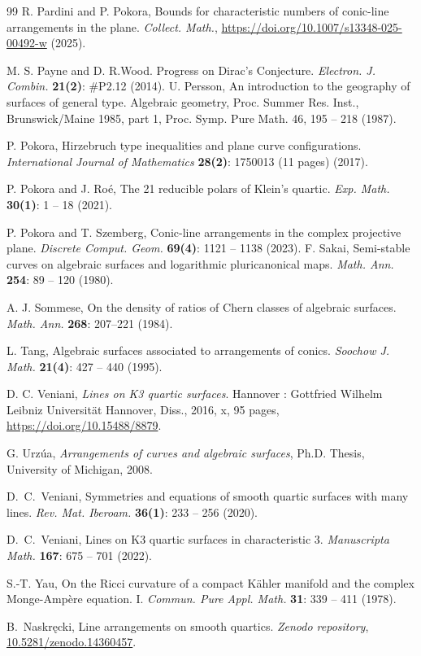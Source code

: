 \documentclass{article}
\theoremstyle{plain}
\theoremstyle{definition}
\numberwithin{equation}{section}
\begin{document}
\begin{thebibliography}{99}
R. Pardini and P. Pokora, Bounds for characteristic numbers of conic-line arrangements in the plane. \textit{Collect. Math.}, \url{ https://doi.org/10.1007/s13348-025-00492-w} (2025).

M. S. Payne and D. R.Wood. Progress on Dirac's Conjecture. \textit{Electron. J. Combin.} \textbf{21(2)}: \#P2.12 (2014).
U. Persson, An introduction to the geography of surfaces of general type. Algebraic geometry, Proc. Summer Res. Inst., Brunswick/Maine 1985, part 1, Proc. Symp. Pure Math. 46, 195 -- 218 (1987).

P. Pokora, \newblock Hirzebruch type inequalities and plane curve configurations. \newblock \textit{International Journal of Mathematics} \textbf{28(2)}: 1750013 (11 pages) (2017).

P. Pokora and J. Ro\'e, The 21 reducible polars of Klein's quartic. \textit{Exp. Math.} \textbf{30(1)}: 1 -- 18 (2021).

P. Pokora and T. Szemberg, Conic-line arrangements in the complex projective plane. \textit{Discrete Comput. Geom.} \textbf{69(4)}: 1121 -- 1138 (2023).
F. Sakai, \newblock Semi-stable curves on algebraic surfaces and logarithmic pluricanonical maps. \newblock \textit{Math. Ann.} \textbf{254}: 89 -- 120 (1980).

A. J. Sommese, On the density of ratios of Chern classes of algebraic surfaces. \textit{Math. Ann.} \textbf{268}: 207--221 (1984).

L. Tang, Algebraic surfaces associated to arrangements of conics.  \textit{Soochow J. Math.} \textbf{21(4)}: 427 -- 440 (1995).

D. C. Veniani,  \textit{Lines on K3 quartic surfaces}. Hannover : Gottfried Wilhelm Leibniz Universit\"at Hannover, Diss., 2016, x, 95 pages, \url{https://doi.org/10.15488/8879}.

G. Urz\'ua, \emph{Arrangements of curves and algebraic surfaces}, Ph.D. Thesis, University of Michigan, 2008.

D.~C.~Veniani, Symmetries and equations of smooth quartic surfaces with many lines. \emph{Rev. Mat. Iberoam.} \textbf{36(1)}: 233 -- 256 (2020). 

D.~C.~Veniani, Lines on K3 quartic surfaces in characteristic $3$. \emph{Manuscripta Math.} \textbf{167}: 675 -- 701 (2022). 

S.-T. Yau, On the Ricci curvature of a compact K\"ahler manifold and the complex Monge-Ampère equation. I. \textit{Commun. Pure Appl. Math.} \textbf{31}: 339 -- 411 (1978).

B.~Naskręcki, Line arrangements on smooth quartics. \emph{Zenodo repository}, 
\url{10.5281/zenodo.14360457}.

\end{thebibliography}
\end{document}
